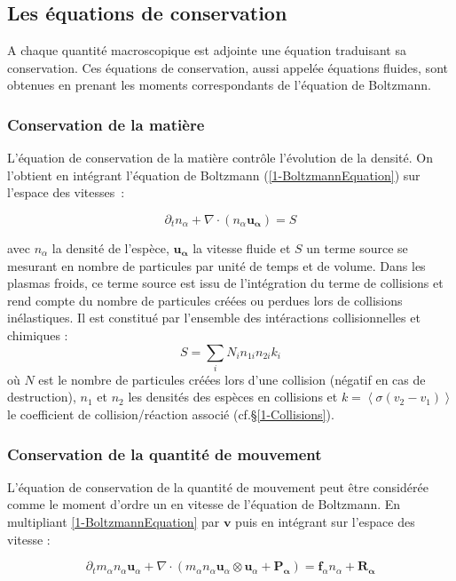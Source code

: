 \begin{refsection}
\subsection{Les équations de conservation}

A chaque quantité macroscopique est adjointe une équation traduisant sa
conservation. Ces équations de conservation, aussi appelée équations fluides,
sont obtenues en prenant les moments correspondants de l'équation de Boltzmann.

\subsubsection{Conservation de la matière}
L'équation de conservation de la matière contrôle
l'évolution de la densité. On l'obtient en intégrant
l'équation de Boltzmann (\eqref{1-BoltzmannEquation}) sur l'espace des
vitesses~:

\begin{equation}
	\partial_tn_\alpha+
	\nabla\cdot\left(n_\alpha\mathbf{u_\alpha}\right)=S
\end{equation}

avec $n_\alpha$ la densité de l'espèce, $\mathbf{u_\alpha}$ la vitesse
fluide et $S$ un terme source se mesurant en nombre de particules par
unité de temps et de volume. Dans les plasmas froids, ce terme source est issu
de l'intégration du terme de collisions et rend compte du nombre de particules
créées ou perdues lors de collisions inélastiques. Il est constitué
par l'ensemble des intéractions collisionnelles et chimiques :
$$S=\sum_i N_i n_{1i}n_{2i}k_i$$ où $N$ est le nombre de particules créées lors
d'une collision (négatif en cas de destruction), $n_1$ et $n_2$ les densités des espèces en collisions et
$k=\left<\sigma (v_2-v_1)\right>$ le coefficient de collision/réaction associé
(cf.\S\ref{1-Collisions}). 

\subsubsection{Conservation de la quantité de mouvement}
L'équation de conservation de la quantité de mouvement peut être considérée
comme le moment d'ordre un en vitesse de l'équation de Boltzmann. En multipliant
\eqref{1-BoltzmannEquation} par $\mathbf v$ puis en intégrant sur l'espace des
vitesse :

\begin{equation}
\partial_t m_\alpha n_\alpha \mathbf{u}_\alpha + 
\nabla\cdot\left(m_\alpha n_\alpha
\mathbf{u}_\alpha\otimes\mathbf{u}_\alpha+\mathbf{P_\alpha}\right)=\mathbf
f_\alpha n_\alpha+\mathbf{R_\alpha}
\end{equation}


\end{refsection}
